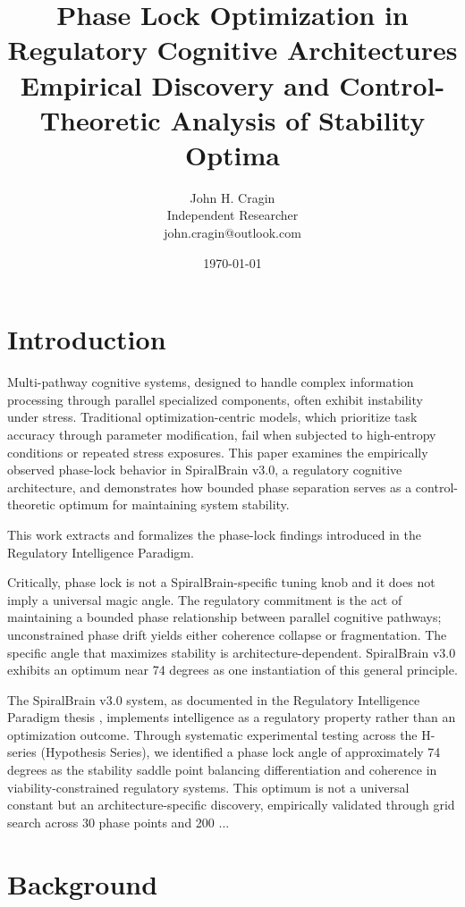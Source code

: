 \documentclass[12pt,a4paper]{article}
\title{Phase Lock Optimization in Regulatory Cognitive Architectures\\
\large Empirical Discovery and Control-Theoretic Analysis of Stability Optima}
\author{John H. Cragin \\
Independent Researcher \\
john.cragin@outlook.com}
\date{\today}
\begin{document}
\maketitle

\section{Introduction}

Multi-pathway cognitive systems, designed to handle complex information processing through parallel specialized components, often exhibit instability under stress. Traditional optimization-centric models, which prioritize task accuracy through parameter modification, fail when subjected to high-entropy conditions or repeated stress exposures. This paper examines the empirically observed phase-lock behavior in SpiralBrain v3.0, a regulatory cognitive architecture, and demonstrates how bounded phase separation serves as a control-theoretic optimum for maintaining system stability.

This work extracts and formalizes the phase-lock findings introduced in the Regulatory Intelligence Paradigm.

Critically, phase lock is not a SpiralBrain-specific tuning knob and it does not imply a universal magic angle. The regulatory commitment is the act of maintaining a bounded phase relationship between parallel cognitive pathways; unconstrained phase drift yields either coherence collapse or fragmentation. The specific angle that maximizes stability is architecture-dependent. SpiralBrain v3.0 exhibits an optimum near 74 degrees as one instantiation of this general principle.

The SpiralBrain v3.0 system, as documented in the Regulatory Intelligence Paradigm thesis \cite{Cragin2026RI}, implements intelligence as a regulatory property rather than an optimization outcome. Through systematic experimental testing across the H-series (Hypothesis Series), we identified a phase lock angle of approximately 74 degrees as the stability saddle point balancing differentiation and coherence in viability-constrained regulatory systems. This optimum is not a universal constant but an architecture-specific discovery, empirically validated through grid search across 30 phase points and 200 ...

\section{Background}
\end{document}
